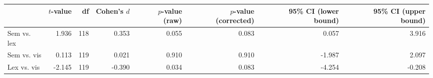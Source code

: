 \begin{tabular}{lrrrrrrr}
\toprule
{} & $t$-value &  df & Cohen's $d$ & $p$-value (raw) & $p$-value (corrected) & 95\% CI (lower bound) & 95\% CI (upper bound) \\
\midrule
Sem vs. lex &     1.936 & 118 &       0.353 &           0.055 &                 0.083 &                 0.057 &                 3.916 \\
Sem vs. vis &     0.113 & 119 &       0.021 &           0.910 &                 0.910 &                -1.987 &                 2.097 \\
Lex vs. vis &    -2.145 & 119 &      -0.390 &           0.034 &                 0.083 &                -4.254 &                -0.208 \\
\bottomrule
\end{tabular}
